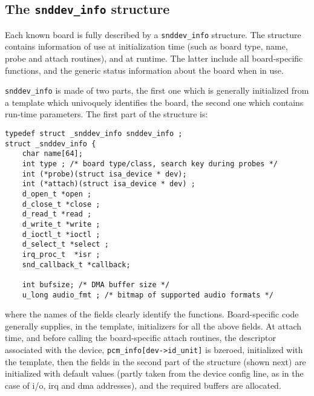 \documentclass[11pt]{article}
\begin{document}
\subsection{The {\tt snddev\_info} structure}

Each known board is fully described by a {\tt snddev\_info}
structure. The structure contains information of use at initialization
time (such as board type, name, probe and attach routines), and at
runtime. The latter include all board-specific functions, and the
generic status information about the board when in use.

{\tt snddev\_info} is made of two parts, the first one which is
generally initialized from a template which univoquely identifies the
board, the second one which contains run-time parameters. The first part
of the structure is:

\begin{verbatim}
typedef struct _snddev_info snddev_info ;
struct _snddev_info {
    char name[64];
    int type ; /* board type/class, search key during probes */
    int (*probe)(struct isa_device * dev);
    int (*attach)(struct isa_device * dev) ;
    d_open_t *open ;
    d_close_t *close ;
    d_read_t *read ;
    d_write_t *write ;
    d_ioctl_t *ioctl ; 
    d_select_t *select ;
    irq_proc_t  *isr ; 
    snd_callback_t *callback;

    int bufsize; /* DMA buffer size */
    u_long audio_fmt ; /* bitmap of supported audio formats */
\end{verbatim}
where the names of the fields clearly identify the functions.
Board-specific code generally supplies, in the template, initializers
for all the above fields. At attach time, and before calling the
board-specific attach routines, the descriptor associated with the
device, {\tt pcm\_info[dev->id\_unit]} is bzeroed, initialized with
the template, then the fields in the second part of the structure
(shown next) are initialized with default values (partly taken from
the device config line, as in the case of i/o, irq and dma addresses),
and the required buffers are allocated.
\end{document}
